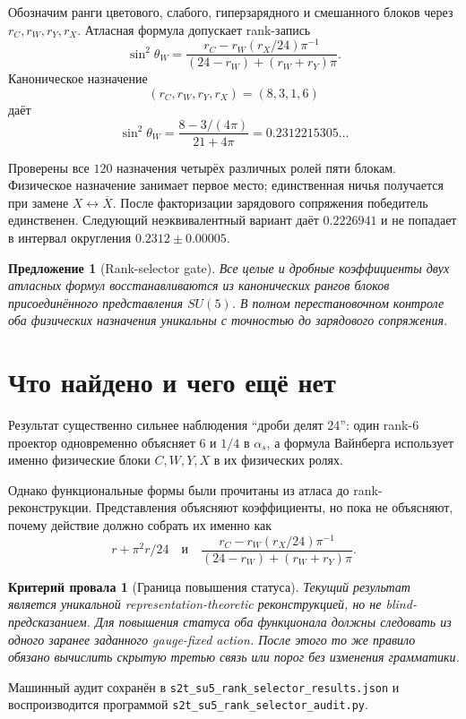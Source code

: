 \documentclass[12pt,a4paper]{article}
\newtheorem{proposition}{Предложение}
\newtheorem{nogocriterion}{Критерий провала}
\begin{document}
Обозначим ранги цветового, слабого, гиперзарядного и смешанного блоков через
$r_C,r_W,r_Y,r_X$. Атласная формула допускает rank-запись
\begin{equation}
 \sin^2\theta_W
 =\frac{r_C-r_W(r_X/24)\pi^{-1}}
 {(24-r_W)+(r_W+r_Y)\pi}.
\end{equation}
Каноническое назначение
\begin{equation}
 (r_C,r_W,r_Y,r_X)=(8,3,1,6)
\end{equation}
даёт
\begin{equation}
 \sin^2\theta_W
 =\frac{8-3/(4\pi)}{21+4\pi}
 =0.2312215305\ldots
\end{equation}

Проверены все $120$ назначения четырёх различных ролей пяти блокам. Физическое
назначение занимает первое место; единственная ничья получается при замене
$X\leftrightarrow\overline X$. После факторизации зарядового сопряжения
победитель единственен. Следующий неэквивалентный вариант даёт $0.2226941$ и
не попадает в интервал округления $0.2312\pm0.00005$.

\begin{proposition}[Rank-selector gate]
Все целые и дробные коэффициенты двух атласных формул восстанавливаются из
канонических рангов блоков присоединённого представления $SU(5)$. В полном
перестановочном контроле оба физических назначения уникальны с точностью до
зарядового сопряжения.
\end{proposition}

\section{Что найдено и чего ещё нет}

Результат существенно сильнее наблюдения ``дроби делят 24'': один rank-$6$
проектор одновременно объясняет $6$ и $1/4$ в $\alpha_s$, а формула Вайнберга
использует именно физические блоки $C,W,Y,X$ в их физических ролях.

Однако функциональные формы были прочитаны из атласа до rank-реконструкции.
Представления объясняют коэффициенты, но пока не объясняют, почему действие
должно собрать их именно как
\begin{equation}
 r+\pi^2r/24
 \quad\text{и}\quad
 \frac{r_C-r_W(r_X/24)\pi^{-1}}
 {(24-r_W)+(r_W+r_Y)\pi}.
\end{equation}

\begin{nogocriterion}[Граница повышения статуса]
Текущий результат является уникальной representation-theoretic
реконструкцией, но не blind-предсказанием. Для повышения статуса оба
функционала должны следовать из одного заранее заданного gauge-fixed action.
После этого то же правило обязано вычислить скрытую третью связь или порог без
изменения грамматики.
\end{nogocriterion}

Машинный аудит сохранён в
\texttt{s2t\_su5\_rank\_selector\_results.json} и воспроизводится программой
\texttt{s2t\_su5\_rank\_selector\_audit.py}.
\end{document}
